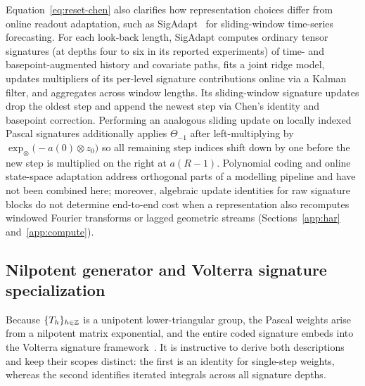 \begin{remark}
\label{app:sigadapt}
Equation~\eqref{eq:reset-chen} also clarifies how representation choices differ
from online readout adaptation, such as SigAdapt~\cite{sigadapt} for sliding-window
time-series forecasting. For each look-back length, SigAdapt computes ordinary
tensor signatures (at depths four to six in its reported experiments) of
time- and basepoint-augmented history and covariate paths, fits a joint ridge
model, updates multipliers of its per-level signature contributions online via a
Kalman filter, and aggregates across window lengths. Its sliding-window signature
updates drop the oldest step and append the newest step via Chen's identity and basepoint
correction. Performing an analogous sliding update on locally indexed Pascal
signatures additionally applies \(\Theta_{-1}\) after left-multiplying by
\(\exp_\otimes\bigl(-a(0)\otimes z_0\bigr)\) so all remaining step indices shift
down by one before the new step is multiplied on the right at \(a(R-1)\).
Polynomial coding and online state-space adaptation address orthogonal parts of a
modelling pipeline and have not been combined here; moreover, algebraic update
identities for raw signature blocks do not determine end-to-end cost when a
representation also recomputes windowed Fourier transforms or lagged geometric
streams (Sections~\ref{app:har} and~\ref{app:compute}).
\end{remark}

\subsection{Nilpotent generator and Volterra signature specialization}
\label{app:nilpotent}
Because \(\{T_h\}_{h \in \mathbb{Z}}\) is a unipotent lower-triangular group, the Pascal
weights arise from a nilpotent matrix exponential, and the entire coded signature
embeds into the Volterra signature framework~\cite{volterra}. It is instructive
to derive both descriptions and keep their scopes distinct: the first is an
identity for single-step weights, whereas the second identifies iterated
integrals across all signature depths.

